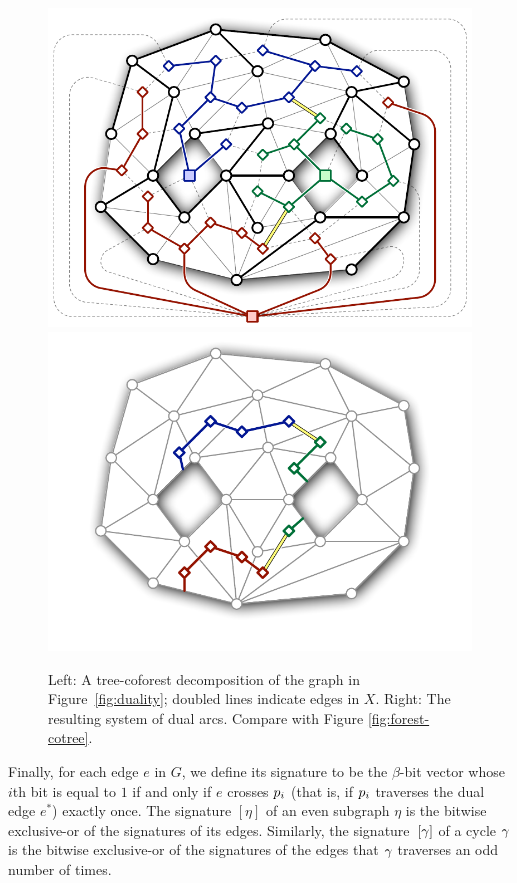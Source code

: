 \begin{figure}[htb]
\centering\footnotesize\sf
\includegraphics[scale=0.45]{Fig/tree-coforest2} \qquad
\includegraphics[scale=0.45]{Fig/tree-coforest-arcs2}
\caption{Left: A tree-coforest decomposition of the graph in Figure~\ref{fig:duality}; doubled lines indicate edges in $X$.
Right: The resulting system of dual arcs.  Compare with Figure \ref{fig:forest-cotree}.}
\label{fig:tree-coforest}
\end{figure}

Finally, for each edge $e$ in $G$, we define its signature \EMPH{$[e]$} to be the $\beta$-bit vector whose $i$th bit is equal to $1$ if and only if $e$ crosses $p_i$ (that is, if $p_i$ traverses the dual edge $e^*$) exactly once.  The signature $[\eta]$ of an even subgraph $\eta$ is the bitwise exclusive-or of the signatures of its edges.  Similarly, the signature~$[\gamma]$ of a cycle $\gamma$ is the bitwise exclusive-or of the signatures of the edges that $\gamma$ traverses an odd number of times.


